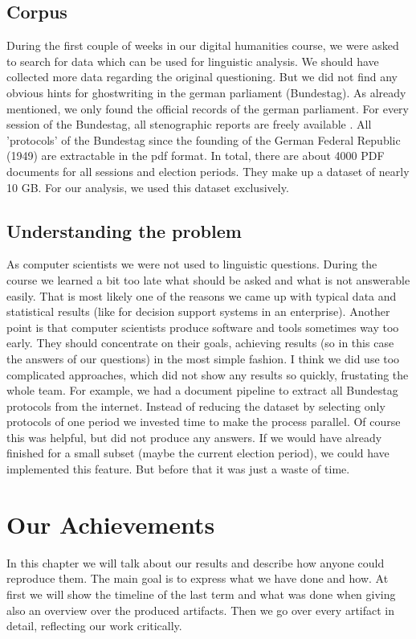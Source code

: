 \documentclass[12pt,paper=a4,nenglish]{scrreprt}
\begin{document}
\section{Corpus}
During the first couple of weeks in our digital humanities course, we were
asked to search for data which can be used for linguistic analysis.
We should have collected more data regarding the original questioning. But we
did not find any obvious hints for ghostwriting in the german
parliament (Bundestag). 
As already mentioned, we only found the official records of the german
parliament.
For every session of the Bundestag, all stenographic reports are freely
available \cite{link_plenarprotokolle}. All 'protocols' of the Bundestag since the founding of the German Federal Republic
(1949) are extractable in the pdf format. In total, there are about 4000 PDF
documents for all sessions and election periods. 
They make up a dataset of nearly 10 GB. 
For our analysis, we used this dataset exclusively. 
\section{Understanding the problem}
\label{sec:understanding_the_problem}
As computer scientists we were not used to linguistic questions.
During the course we learned a bit too late what should be asked and what is
not answerable easily. That is most likely one of the reasons we came up with
typical data and statistical results (like for decision support systems in an enterprise). 
Another point is that computer scientists produce software and tools sometimes
way too early. They should concentrate on their goals, achieving results (so in
this case the answers of our questions) in the most simple fashion. I think we
did use too complicated approaches, which did not show any results so quickly,
frustating the whole team. For example, we had a document pipeline to extract
all Bundestag protocols from the internet. Instead of reducing the dataset by
selecting only protocols of one period we invested time to make the process
parallel. Of course this was  helpful, but did not produce any answers. If we
would have already finished for a small subset (maybe the current
election period), we could have implemented this feature. But
before that it was just a waste of time.

\chapter{Our Achievements}
In this chapter we will talk about our results
and describe how anyone could reproduce them. The main goal is to express what
we have done and how. At first we will show the timeline of the
last term and what was done when giving also an overview over the produced
artifacts.
Then we go over every artifact in detail, reflecting
our work critically. 
\end{document}
